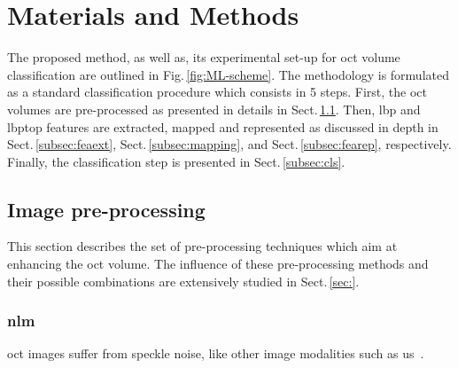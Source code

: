 \graphicspath{ {./content/method/figures/}}

\section{Materials and Methods}\label{sec:method}

The proposed method, as well as, its experimental set-up for \ac{oct} volume classification are outlined in Fig.\,\ref{fig:ML-scheme}.
The methodology is formulated as a standard classification procedure which consists in 5 steps.
First, the \ac{oct} volumes are pre-processed as presented in details in Sect.\,\ref{subsec:prepro}.
Then, \ac{lbp} and \ac{lbptop} features are extracted, mapped and represented as discussed in depth in Sect.\,\ref{subsec:feaext}, Sect.\,\ref{subsec:mapping}, and Sect.\,\ref{subsec:fearep}, respectively.
Finally, the classification step is presented in Sect.\,\ref{subsec:cls}.


\subsection{Image pre-processing}\label{subsec:prepro}

This section describes the set of pre-processing techniques which aim at enhancing the \ac{oct} volume.
The influence of these pre-processing methods and their possible combinations are extensively studied in Sect.\,\ref{sec:}. 


\subsubsection{\acf{nlm}}
\ac{oct} images suffer from speckle noise, like other image modalities such as \ac{us}~\cite{schmitt1999speckle}.

